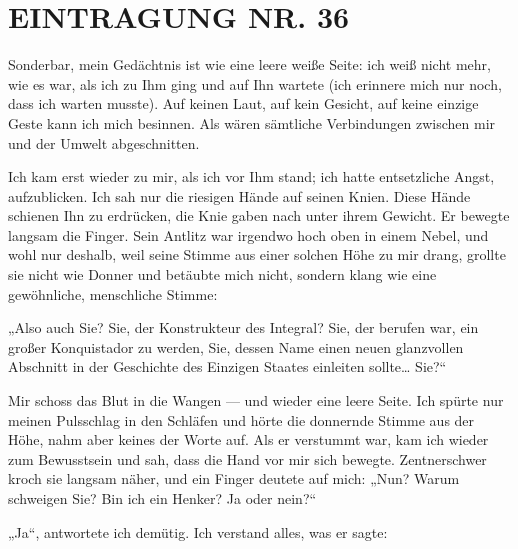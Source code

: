 \section{EINTRAGUNG NR. 36}

Sonderbar, mein Gedächtnis ist wie eine leere weiße Seite: ich weiß
nicht mehr, wie es war, als ich zu Ihm ging und auf Ihn wartete
(ich erinnere mich nur noch, dass ich warten musste). Auf keinen
Laut, auf kein Gesicht, auf keine einzige Geste kann ich mich
besinnen. Als wären
sämtliche Verbindungen zwischen mir und der Umwelt abgeschnitten.

Ich kam erst wieder zu mir, als ich vor Ihm stand; ich hatte
entsetzliche Angst, aufzublicken. Ich sah nur die riesigen Hände
auf seinen Knien. Diese Hände schienen Ihn zu erdrücken, die Knie
gaben nach unter ihrem Gewicht. Er bewegte langsam die Finger. Sein
Antlitz war irgendwo hoch oben in einem Nebel, und wohl nur
deshalb, weil seine Stimme aus einer solchen Höhe zu mir drang,
grollte sie nicht wie Donner und betäubte mich nicht, sondern klang
wie eine gewöhnliche, menschliche Stimme:

„Also auch Sie? Sie, der Konstrukteur des Integral? Sie, der
berufen war, ein großer Konquistador zu werden, Sie, dessen Name
einen neuen glanzvollen Abschnitt in der Geschichte des Einzigen
Staates einleiten sollte\ldots{} Sie?“

Mir schoss das Blut in die Wangen
— und wieder eine leere Seite. Ich spürte nur meinen Pulsschlag in
den Schläfen und hörte die donnernde Stimme aus der Höhe, nahm aber
keines der Worte auf. Als er verstummt war, kam ich wieder zum
Bewusstsein und sah, dass die Hand vor mir sich bewegte.
Zentnerschwer kroch sie langsam näher, und ein Finger deutete auf
mich: „Nun? Warum schweigen Sie? Bin ich ein Henker? Ja oder
nein?“

„Ja“, antwortete ich demütig. Ich verstand alles, was er sagte:

